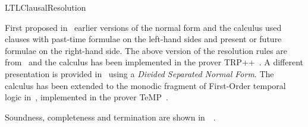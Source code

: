 \begin{entry}{LTLClausalResolution}
\begin{history}
First proposed in~\cite{Fis90-resolve} earlier versions of 
the normal form and the calculus used clauses with past-time formulae
on the left-hand sides and present or future formulae on the
right-hand side. The above version of the resolution rules are
from~\cite{FDP01} and the calculus has been implemented in the prover
TRP++~\cite{HustadtKonev2003a}. 
A different presentation is provided in~\cite{DFK02}
using a {\em Divided Separated Normal Form}.
The calculus has been extended to the monodic fragment of First-Order 
temporal logic in~\cite{DBLP:journals/tocl/DegtyarevFK06}, implemented in the prover TeMP~\cite{DBLP:conf/cade/HustadtKRV04}.
\end{history}

\begin{technicalities}
Soundness, completeness and termination are shown in~~\cite{FDP01}.
\end{technicalities}



%
%
%
%
%
%
% 
%




\end{entry}
